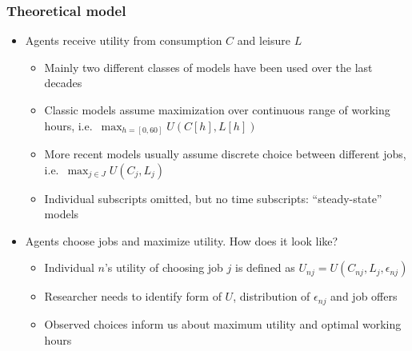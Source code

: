 \documentclass[handout,intlimits]{beamer}
\def\litc#1{\textcolor{med-gray}{\tiny\citep{#1}}}
\def\litf#1{\textcolor{med-gray}{\tiny\citep*{#1}}}
\def\blue#1{\textcolor{zewblue}{#1}}
\begin{document}
\begin{frame}
\frametitle{Theoretical model}
\begin{itemize}
	\item \blue{Agents receive utility from consumption $C$ and leisure $L$}
	\begin{itemize}
		\item Mainly two different classes of models have been used over the last decades
		\smallskip
		\item Classic models assume maximization over continuous range of working hours, i.e.\ \blue{$\max_{h=[0,60]} U(C[h],L[h])$} \litc{burtless_hausman_1978, hausman_1981}
		\smallskip
		\item More recent models usually assume discrete choice between different jobs, i.e.\ \blue{$\max_{j\in J} U(C_j,L_j)$} \litf{aaberge_etal_1995, vansoest_1995, hoynes_1996}
		\smallskip
		\item Individual subscripts omitted, but no time subscripts: ``steady-state'' models
	\end{itemize}
	\bigskip
	\item \blue{Agents choose jobs and maximize utility.} How does it look like?
	\begin{itemize}
		\item Individual $n$'s utility of choosing job $j$ is defined as \blue{$U_{nj} = U\left(C_{nj},L_j,\epsilon_{nj}\right)$}
		\smallskip
		\item Researcher needs to identify form of $U$, distribution of $\epsilon_{nj}$ and job offers
		\smallskip
		\item Observed choices inform us about maximum utility and optimal working hours
	\end{itemize}
\end{itemize}
\end{frame}
\end{document}
